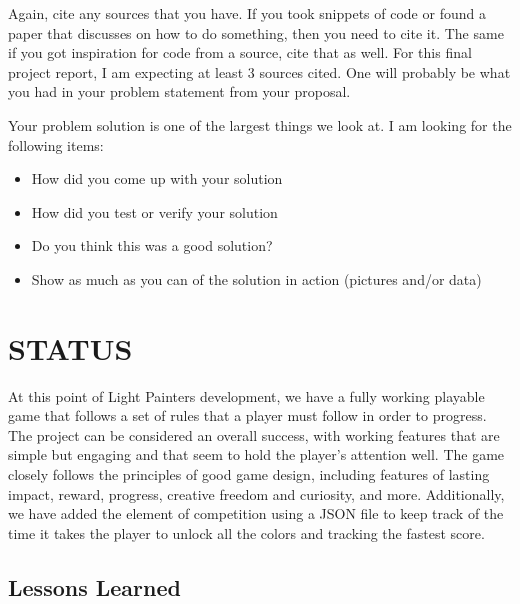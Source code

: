 \documentclass[12pt]{article}
\begin{document}
Again, cite any sources that you have.  If you took snippets of code or found a paper that discusses on how to do something, then you need to cite it. The same if you got inspiration for code from a source, cite that as well. For this final project report, I am expecting at least 3 sources cited.  One will probably be what you had in your problem statement from your proposal.  

Your problem solution is one of the largest things we look at. I am looking for the following items:

\begin{itemize}
    \item How did you come up with your solution
    \item How did you test or verify your solution
    \item Do you think this was a good solution?
    \item Show as much as you can of the solution in action (pictures and/or data)
\end{itemize}


\section{STATUS}

At this point of Light Painters development, we have a fully working playable game that follows a set of rules that a player must follow in order to progress. The project can be considered an overall success, with working features that are simple but engaging and that seem to hold the player's attention well. The game closely follows the principles of good game design, including features of lasting impact, reward, progress, creative freedom and curiosity, and more. Additionally, we have added the element of competition using a JSON file to keep track of the time it takes the player to unlock all the colors and tracking the fastest score.

\subsection{Lessons Learned}
\end{document}
